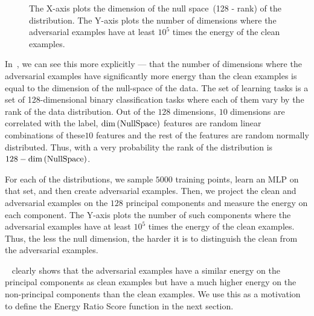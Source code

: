 \begin{wrapfigure}{r}{0.5\linewidth}\vspace{-10pt}
  \def\svgwidth{0.99\linewidth}
  
  \caption{The X-axis plots the dimension of the null space~(128 - rank) of the
  distribution. The Y-axis plots the number of dimensions where the adversarial
  examples have at least \(10^5\) times the energy of the clean examples.}
  \label{fig:128-dim-null-space-adv-space}\vspace{-15pt}
\end{wrapfigure}

In~, we can see this more explicitly ---
that the number of dimensions where the adversarial examples have significantly
more energy than the clean examples is equal to the dimension of the null-space
of the data. The set of learning tasks is a set of 128-dimensional binary
classification tasks where each of them vary by the rank of the data
distribution. Out of the \(128\) dimensions, \(10\) dimensions are correlated
with the label, \(\mathrm{dim}\left({\mathrm{Null Space}}\right)\) features are random
linear combinations of these\(10\) features and the rest of the features are
random normally distributed. Thus, with a very probability the rank of the
distribution is \(128 - \mathrm{dim}\left({\mathrm{Null Space}}\right)\). 

For each of the distributions, we sample \(5000\) training points, learn an MLP
on that set, and then create adversarial examples. Then, we project the clean
and adversarial examples on the \(128\) principal components and measure the
energy on each component. The Y-axis plots the number of such components where
the adversarial examples have at least \(10^5\) times the energy of the clean
examples. Thus, the less the null dimension, the harder it is to distinguish the
clean from the adversarial examples. 

~ clearly shows that the
adversarial examples have a similar energy on the principal components as clean
examples but have a much higher energy on the non-principal components than the
clean examples. We use this as a motivation to define the Energy Ratio Score
function in the next section.


